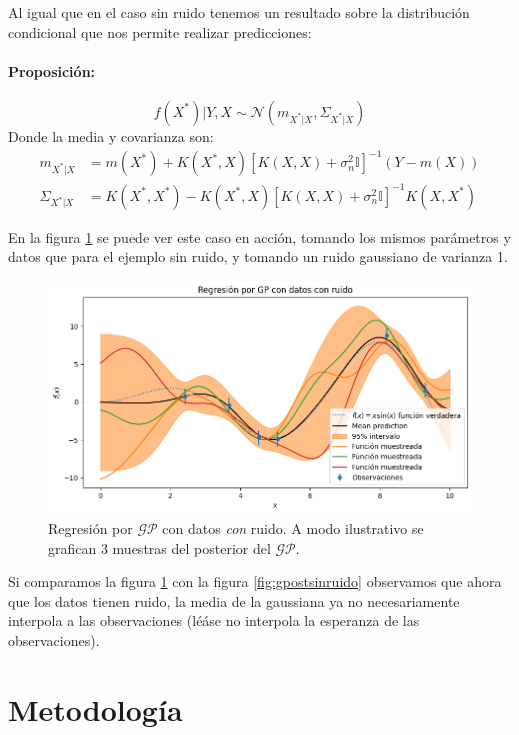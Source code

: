 \documentclass[a4paper]{article}
\newcommand{\gp}{\ensuremath{\mathcal{GP}}}
\begin{document}
Al igual que en el caso sin ruido tenemos un resultado sobre la distribución condicional que nos permite realizar predicciones:
\paragraph{Proposición:} 
	\begin{equation}
	f(X^*)|Y, X  \sim \mathcal{N}(m_{X^*|X}, \Sigma_{X^*|X})\label{eq:gp_posterior}
\end{equation}
Donde la media y covarianza son:
\begin{align}
	m_{X^*|X} & = m(X^*) + K(X^*, X) \left[K(X, X) + \sigma_n^2\mathbb{I}\right]^{-1} \left(Y - m(X)\right)\\
	\Sigma_{X^*|X} & = K(X^*, X^*) - K(X^*, X) \left[K(X, X) + \sigma_n^2\mathbb{I}\right]^{-1} K(X, X^*)
\end{align}

En la figura \ref{fig:gpostconruido} se puede ver este caso en acción, tomando los mismos parámetros y datos que para el ejemplo sin ruido, y tomando un ruido gaussiano de varianza 1.
\begin{figure}[H]
	\centering
	\includegraphics[trim={0cm 0cm 0cm 0cm},clip,width=\textwidth]{gppostconruido.png}
	\caption{Regresión por $\gp$ con datos \emph{con} ruido. A modo ilustrativo se grafican 3 muestras del posterior del $\gp$.}
	\label{fig:gpostconruido}
\end{figure}
Si comparamos la figura \ref{fig:gpostconruido} con la figura \ref{fig:gpostsinruido} observamos que ahora que los datos tienen ruido, la media de la gaussiana ya no necesariamente interpola a las observaciones (léáse no interpola la esperanza de las observaciones).



\section{Metodología}
\end{document}
